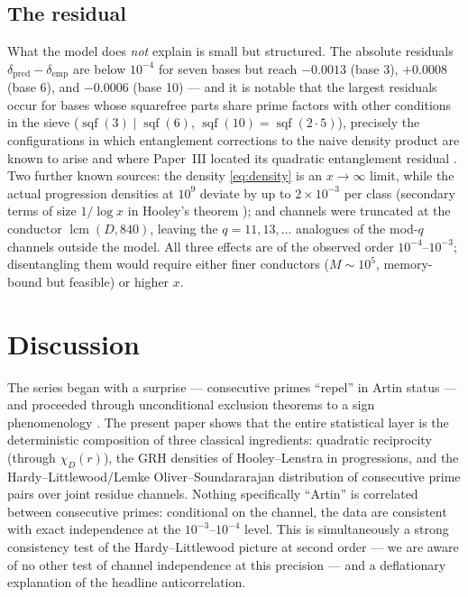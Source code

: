 \documentclass[11pt,reqno]{amsart}
\theoremstyle{plain}
\theoremstyle{definition}
\DeclareMathOperator{\sqf}{sqf}
\begin{document}
\subsection{The residual}

What the model does \emph{not} explain is small but structured. The absolute
residuals $\delta_{\mathrm{pred}} - \delta_{\mathrm{emp}}$ are below
$10^{-4}$ for seven bases but reach $-0.0013$ (base 3), $+0.0008$ (base 6),
and $-0.0006$ (base 10) --- and it is notable that the largest residuals
occur for bases whose squarefree parts share prime factors with other
conditions in the sieve ($\sqf(3) \mid \sqf(6)$, $\sqf(10) = \sqf(2 \cdot 5)$),
precisely the configurations in which entanglement corrections to the naive
density product are known to arise \cite{Lenstra1977,
JarviniemiPeruccaSgobba2025} and where Paper~III located its quadratic
entanglement residual \cite{BaldIII}. Two further known sources: the density
\eqref{eq:density} is an $x \to \infty$ limit, while the actual progression
densities at $10^9$ deviate by up to $2 \times 10^{-3}$ per class (secondary
terms of size $1/\log x$ in Hooley's theorem \cite{Hooley1967,
FanPollack2025}); and channels were truncated at the conductor
$\operatorname{lcm}(D, 840)$, leaving the $q = 11, 13, \dots$ analogues of
the mod-$q$ channels outside the model. All three effects are of the
observed order $10^{-4}$--$10^{-3}$; disentangling them would require either
finer conductors ($M \sim 10^5$, memory-bound but feasible) or higher $x$.

\section{Discussion}

The series began with a surprise --- consecutive primes ``repel'' in Artin
status --- and proceeded through unconditional exclusion theorems
\cite{BaldI, BaldII, BaldIV} to a sign phenomenology \cite{BaldV}. The
present paper shows that the entire statistical layer is the deterministic
composition of three classical ingredients: quadratic reciprocity (through
$\chi_D(r)$), the GRH densities of Hooley--Lenstra in progressions, and the
Hardy--Littlewood/Lemke Oliver--Soundararajan distribution of consecutive
prime pairs over joint residue channels. Nothing specifically ``Artin'' is
correlated between consecutive primes: conditional on the channel, the data
are consistent with exact independence at the $10^{-3}$--$10^{-4}$ level.
This is simultaneously a strong consistency test of the
Hardy--Littlewood picture at second order --- we are aware of no other test
of channel independence at this precision --- and a deflationary explanation
of the headline anticorrelation.
\end{document}

